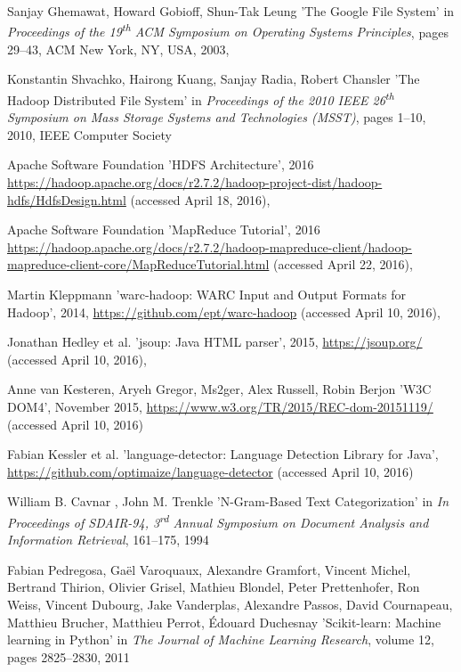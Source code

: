 \begin{thebibliography}{99}
Sanjay Ghemawat, Howard Gobioff, Shun-Tak Leung
'The Google File System'
in \textit{Proceedings of the 19\textsuperscript{th} ACM Symposium on Operating Systems Principles},
pages 29--43,
ACM New York, NY, USA,
2003,

Konstantin Shvachko, Hairong Kuang, Sanjay Radia, Robert Chansler
'The Hadoop Distributed File System'
in \textit{Proceedings of the 2010 IEEE 26\textsuperscript{th} Symposium on Mass Storage Systems and Technologies (MSST)},
pages 1--10,
2010,
IEEE Computer Society

Apache Software Foundation
'HDFS Architecture',
2016
\url{https://hadoop.apache.org/docs/r2.7.2/hadoop-project-dist/hadoop-hdfs/HdfsDesign.html} (accessed April 18, 2016),

Apache Software Foundation
'MapReduce Tutorial',
2016
\url{https://hadoop.apache.org/docs/r2.7.2/hadoop-mapreduce-client/hadoop-mapreduce-client-core/MapReduceTutorial.html} (accessed April 22, 2016),

Martin Kleppmann
'warc-hadoop: WARC Input and Output Formats for Hadoop',
2014,
\url{https://github.com/ept/warc-hadoop} (accessed April 10, 2016),

Jonathan Hedley et al.
'jsoup: Java HTML parser',
2015,
\url{https://jsoup.org/} (accessed April 10, 2016),

Anne van Kesteren, Aryeh Gregor, Ms2ger, Alex Russell, Robin Berjon
'W3C DOM4', 
November 2015,
\url{https://www.w3.org/TR/2015/REC-dom-20151119/} (accessed April 10, 2016)

Fabian Kessler et al.
'language-detector: Language Detection Library for Java',
\url{https://github.com/optimaize/language-detector} (accessed April 10, 2016)

William B. Cavnar , John M. Trenkle
'N-Gram-Based Text Categorization'
in \textit{In Proceedings of SDAIR-94, 3\textsuperscript{rd} Annual Symposium on Document Analysis and Information Retrieval},
161--175,
1994

Fabian Pedregosa, Gaël Varoquaux, Alexandre Gramfort, Vincent Michel, Bertrand Thirion, Olivier Grisel, Mathieu Blondel, Peter Prettenhofer, Ron Weiss, Vincent Dubourg, Jake Vanderplas, Alexandre Passos, David Cournapeau, Matthieu Brucher, Matthieu Perrot, Édouard Duchesnay
'Scikit-learn: Machine learning in Python'
in \textit{The Journal of Machine Learning Research},
volume 12,
pages 2825--2830,
2011

\end{thebibliography}